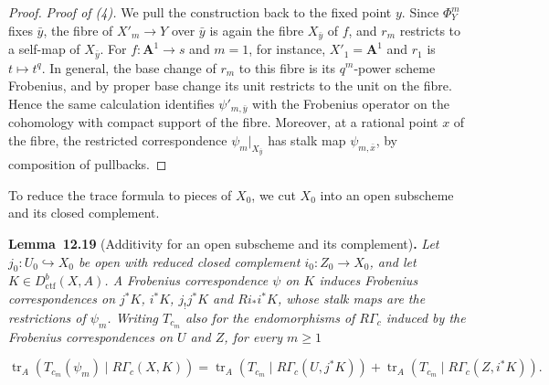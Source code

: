 \documentclass[11pt]{article}
\newenvironment{bpstatement}[2]{\par\addvspace{0.6\baselineskip}\noindent\textbf{#1}#2\textbf{.}\enspace\ignorespaces}
  {\par\addvspace{0.4\baselineskip}}
\newenvironment{bpstatementit}[2]{\begin{bpstatement}{#1}{#2}\itshape\ignorespaces}{\end{bpstatement}}
\begin{document}
\begin{proof}[{Proof}]
\emph{Proof of (4).} We pull the construction back to the fixed point \(y\). Since \(\Phi_Y^m\) fixes \(\bar y\), the fibre of \(X'_m\to Y\) over \(\bar y\) is again the fibre \(X_{\bar y}\) of \(f\), and \(r_m\) restricts to a self-map of \(X_{\bar y}\). For \(f:\mathbf A^1\to s\) and \(m=1\), for instance, \(X'_1=\mathbf A^1\) and \(r_1\) is \(t\mapsto t^q\). In general, the base change of \(r_m\) to this fibre is its \(q^m\)-power scheme Frobenius, and by proper base change its unit restricts to the unit on the fibre. Hence the same calculation identifies \(\psi'_{m,\bar y}\) with the Frobenius operator on the cohomology with compact support of the fibre. Moreover, at a rational point \(x\) of the fibre, the restricted correspondence \(\psi_m|_{X_{\bar y}}\) has stalk map \(\psi_{m,\bar x}\), by composition of pullbacks.
\end{proof}

\label{bp57}%
To reduce the trace formula to pieces of \(X_0\), we cut \(X_0\) into an open subscheme and its closed complement.

\label{bp58}%
\begin{bpstatementit}{Lemma~12.19}{ (Additivity for an open subscheme and its complement)}
Let \(j_0:U_0\hookrightarrow X_0\) be open with reduced closed complement \(i_0:Z_0\to X_0\), and let \(K\in D^b_{\mathrm{ctf}}(X,A)\). A Frobenius correspondence \(\psi\) on \(K\) induces Frobenius correspondences on \(j^*K\), \(i^*K\), \(j_!j^*K\) and \(Ri_*i^*K\), whose stalk maps are the restrictions of \(\psi_m\). Writing \(T_{c_m}\) also for the endomorphisms of \(R\Gamma_c\) induced by the Frobenius correspondences on \(U\) and \(Z\), for every \(m\geq1\)

\[
\operatorname{tr}_A(T_{c_m}(\psi_m)\mid R\Gamma_c(X,K))
=\operatorname{tr}_A(T_{c_m}\mid R\Gamma_c(U,j^*K))
+\operatorname{tr}_A(T_{c_m}\mid R\Gamma_c(Z,i^*K)).
\]
\end{bpstatementit}
\end{document}

